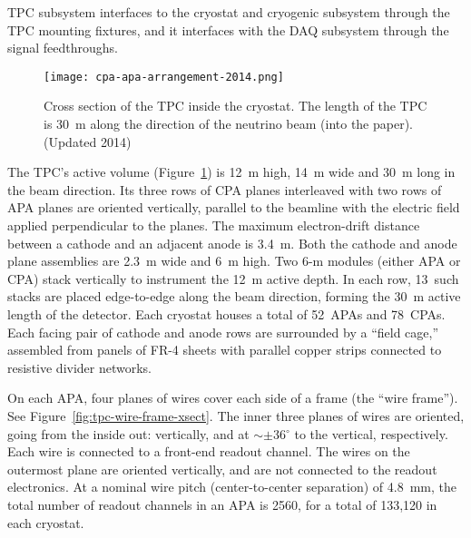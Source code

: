 TPC subsystem interfaces to the cryostat and cryogenic subsystem through the TPC mounting fixtures, 
and it interfaces with the DAQ subsystem through the signal feedthroughs.

\begin{figure}
\centering
\texttt{[image: cpa-apa-arrangement-2014.png]}%
\caption[Cross section of the TPC inside the cryostat]{Cross section of the TPC inside the cryostat.  The length of the TPC is  30~m along the direction of the neutrino beam (into the paper). (Updated 2014) }
\label{fig:tpc-xsect1}
\end{figure}

The TPC's active volume (Figure~\ref{fig:tpc-xsect1}) is 12~m high, 14~m wide and 30~m long in the beam direction. 
Its three rows of CPA planes interleaved with two rows of APA planes 
are oriented vertically, parallel to the beamline with the  
electric field applied perpendicular to the planes.
The maximum electron-drift distance between a cathode and an adjacent 
anode is 3.4~m. Both the cathode and anode plane assemblies are 
2.3~m wide and 6~m high. Two 6-m modules (either APA or CPA)  stack vertically to 
instrument the 12~m active depth. In each row, 13~such stacks are placed 
edge-to-edge 
along the beam direction, forming the 30~m active length of the detector.
Each cryostat houses a total of 52~APAs and 78~CPAs.
Each facing pair of cathode and anode rows are surrounded by a 
``field cage,'' assembled from panels of FR-4 sheets with parallel copper strips connected to resistive divider networks. 

On each APA, four planes of wires cover each side of a frame (the ``wire frame''). See Figure~\ref{fig:tpc-wire-frame-xsect}.
The inner three planes of wires are oriented, going from the inside out: vertically, and at $\sim\pm$36$^\circ$ 
to the vertical, respectively. Each wire is connected to a front-end readout channel.
The wires on the outermost plane are oriented vertically, and are not connected to the readout electronics.
At a nominal wire pitch (center-to-center separation) of 4.8~mm,
the total number of readout channels in an APA is 2560, for a total of 133,120 in each cryostat.
 
